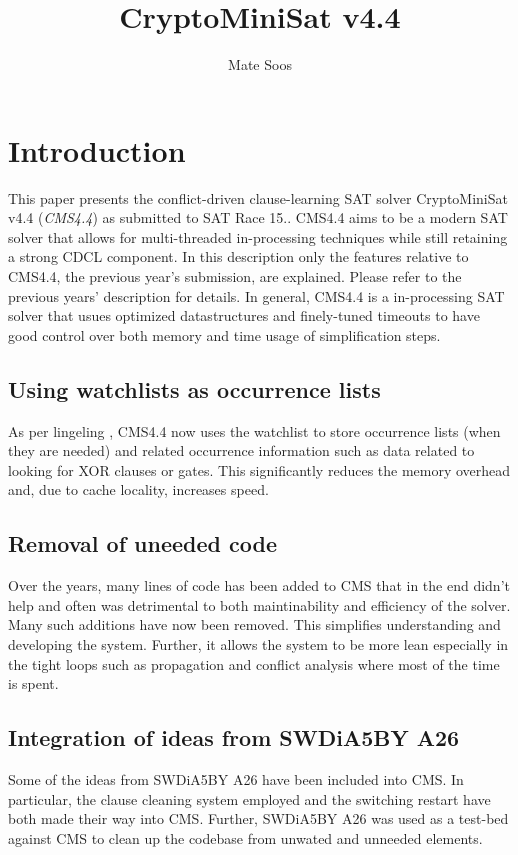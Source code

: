 \documentclass[final]{ieee}
\begin{document}
\title{CryptoMiniSat v4.4}
\author{Mate Soos}

\maketitle
\thispagestyle{empty}
\pagestyle{empty}

\section{Introduction}
This paper presents the conflict-driven clause-learning SAT solver CryptoMiniSat v4.4 (\emph{CMS4.4}) as submitted to SAT Race 15.. CMS4.4 aims to be a modern SAT solver that allows for multi-threaded in-processing techniques while still retaining a strong CDCL component. In this description only the features relative to CMS4.4, the previous year's submission, are explained. Please refer to the previous years' description for details. In general, CMS4.4 is a in-processing SAT solver that usues optimized datastructures and finely-tuned timeouts to have good control over both memory and time usage of simplification steps.

\subsection{Using watchlists as occurrence lists}
As per lingeling \cite{lingeling}, CMS4.4 now uses the watchlist to store occurrence lists (when they are needed) and related occurrence information such as data related to looking for XOR clauses or gates. This significantly reduces the memory overhead and, due to cache locality, increases speed.

\subsection{Removal of uneeded code}
Over the years, many lines of code has been added to CMS that in the end didn't help and often was detrimental to both maintinability and efficiency of the solver. Many such additions have now been removed. This simplifies understanding and developing the system. Further, it allows the system to be more lean especially in the tight loops such as propagation and conflict analysis where most of the time is spent.

\subsection{Integration of ideas from SWDiA5BY A26}
Some of the ideas from SWDiA5BY A26\cite{swdia} have been included into CMS. In particular, the clause cleaning system employed and the switching restart have both made their way into CMS. Further, SWDiA5BY A26 was used as a test-bed against CMS to clean up the codebase from unwated and unneeded elements.
\end{document}
